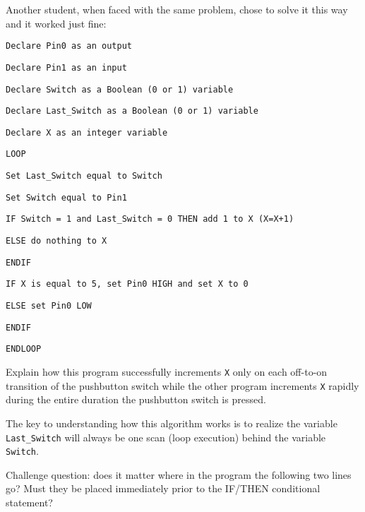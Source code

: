\vskip 10pt

\goodbreak
Another student, when faced with the same problem, chose to solve it this way and it worked just fine:

\vskip 10pt

\noindent
{}

{\tt Declare Pin0 as an output}

{\tt Declare Pin1 as an input}

{\tt Declare Switch as a Boolean (0 or 1) variable}

{\tt Declare Last\_Switch as a Boolean (0 or 1) variable}

{\tt Declare X as an integer variable}

{\tt LOOP}

\hskip 10pt {\tt Set Last\_Switch equal to Switch}

\hskip 10pt {\tt Set Switch equal to Pin1}

\hskip 10pt {\tt IF Switch = 1 and Last\_Switch = 0 THEN add 1 to X (X=X+1)}

\hskip 10pt {\tt ELSE do nothing to X}

\hskip 10pt {\tt ENDIF}

\hskip 10pt {\tt IF X is equal to 5, set Pin0 HIGH and set X to 0}

\hskip 10pt {\tt ELSE set Pin0 LOW}

\hskip 10pt {\tt ENDIF}

{\tt ENDLOOP}

\vskip 10pt

Explain how this program successfully increments {\tt X} only on each off-to-on transition of the pushbutton switch while the other program increments {\tt X} rapidly during the entire duration the pushbutton switch is pressed.







The key to understanding how this algorithm works is to realize the variable {\tt Last\_Switch} will always be one scan (loop execution) behind the variable {\tt Switch}.

\vskip 10pt

Challenge question: does it matter where in the program the following two lines go?  Must they be placed immediately prior to the IF/THEN conditional statement?

\vskip 10pt

